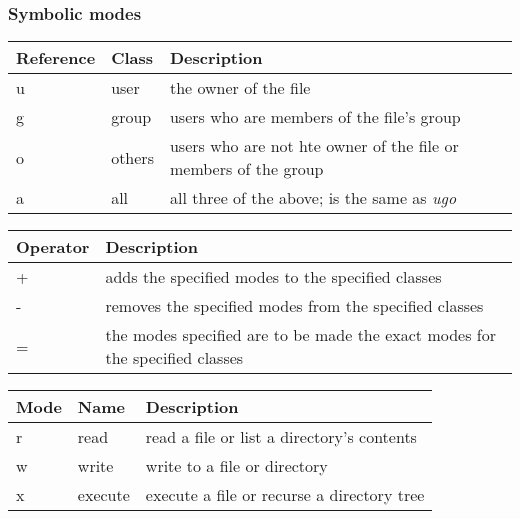 \documentclass[12pt,compress]{beamer}
\begin{document}
\begin{frame}[fragile]
  \frametitle{Symbolic modes}
  \begin{small}
    \begin{center}
      \begin{tabular}{lll}
        Reference  &  Class   &  Description                                                      \\
        \hline
        u          &  user    &  the owner of the file                                            \\
        g          &  group   &  users who are members of the file's group                        \\
        o          &  others  &  users who are not hte owner of the file or members of the group  \\
        a          &  all     &  all three of the above; is the same as \emph{ugo}                \\
      \end{tabular}
    \end{center}

    \begin{center}
      \begin{tabular}{ll}
        Operator  &  Description                                                                   \\
        \hline
        +         &  adds the specified modes to the specified classes                             \\
        -         &  removes the specified modes from the specified classes                        \\
        =         &  the modes specified are to be made the exact modes for the specified classes  \\
      \end{tabular}
    \end{center}

    \begin{center}
      \begin{tabular}{lll}
        Mode  &  Name     &  Description                                 \\
        \hline
        r     &  read     &  read a file or list a directory's contents  \\
        w     &  write    &  write to a file or directory                \\
        x     &  execute  &  execute a file or recurse a directory tree  \\
      \end{tabular}
    \end{center}
  \end{small}
\end{frame}
\end{document}
